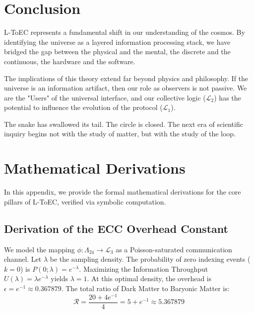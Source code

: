 \documentclass[11pt,titlepage]{article}
\newcommand{\protocol}{\mathcal{L}_1}
\newcommand{\logic}{\mathcal{L}_2}
\newcommand{\interface}{\mathcal{L}_3}
\newcommand{\leech}{\Lambda_{24}}
\begin{document}
\section{Conclusion}
\label{sec:conclusion}
L-ToEC represents a fundamental shift in our understanding of the cosmos. By identifying the universe as a layered information processing stack, we have bridged the gap between the physical and the mental, the discrete and the continuous, the hardware and the software.

The implications of this theory extend far beyond physics and philosophy. If the universe is an information artifact, then our role as observers is not passive. We are the "Users" of the universal interface, and our collective logic ($\logic$) has the potential to influence the evolution of the protocol ($\protocol$).

The snake has swallowed its tail. The circle is closed. The next era of scientific inquiry begins not with the study of matter, but with the study of the loop.


\newpage
\appendix
\section{Mathematical Derivations}
\label{app:math}
In this appendix, we provide the formal mathematical derivations for the core pillars of L-ToEC, verified via symbolic computation.

\subsection{Derivation of the ECC Overhead Constant}
We model the mapping $\phi: \leech \to \interface$ as a Poisson-saturated communication channel. Let $\lambda$ be the sampling density. The probability of zero indexing events ($k=0$) is $P(0; \lambda) = e^{-\lambda}$. Maximizing the Information Throughput $U(\lambda) = \lambda e^{-\lambda}$ yields $\lambda = 1$. At this optimal density, the overhead is $\epsilon = e^{-1} \approx 0.367879$. The total ratio of Dark Matter to Baryonic Matter is:
\begin{equation}
\mathcal{R} = \frac{20 + 4e^{-1}}{4} = 5 + e^{-1} \approx 5.367879
\end{equation}
\end{document}
